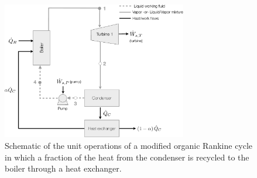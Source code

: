 \begin{figure}[h!]\centering
    \includegraphics[width=0.72\textwidth]{./figs/Fig-Mod-Rankine-ENGRI-1120-F22.pdf}
    \caption{Schematic of the unit operations of a modified organic Rankine cycle in which a fraction of the heat from the condenser is recycled to the boiler through a heat exchanger.}\label{fig-rankine-cycle}
    \end{figure}
    
